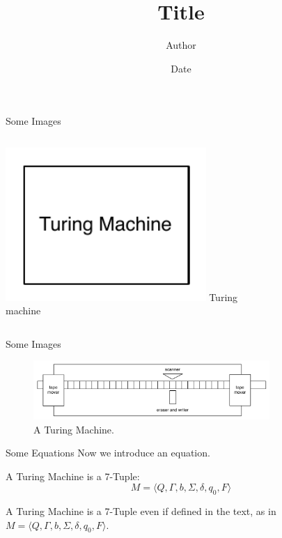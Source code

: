 \documentclass{beamer}
\title              {Title}
\author             {Author}
\institute          {Institute, University of Basel}
\date               {Date}
\begin{document}
\begin{frame}[t,plain]
\titlepage
\end{frame}


\begin{frame}[c]{Some Images}
\begin{columns}[c]
            \includegraphics[width=0.8\textwidth]{block}
            Turing machine
\end{columns}
\end{frame}


\begin{frame}[c]{Some Images}
    \begin{figure}
        \includegraphics[width=0.8\textwidth]{turingmachine}
        \caption{A Turing Machine.}
    \end{figure}
\end{frame}


\begin{frame}[c]{Some Equations}
Now we introduce an equation.
\begin{theorem}
A Turing Machine is a 7-Tuple:
\begin{equation}
    M = \langle Q, \Gamma, b, \Sigma, \delta, q_0, F \rangle
\end{equation}
\end{theorem}
A Turing Machine is a 7-Tuple even if defined in the text, as in $M = \langle Q, \Gamma, b, \Sigma, \delta, q_0, F \rangle$.
\end{frame}
\end{document}
